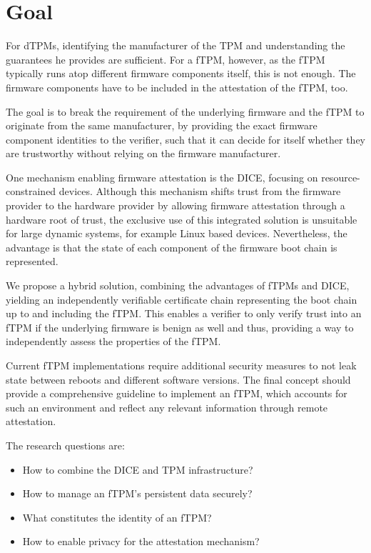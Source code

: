 \section{Goal}

For \acp{dTPM}, identifying the manufacturer of the TPM and understanding the guarantees he provides are sufficient. For a fTPM, however, as the fTPM typically runs atop different firmware components itself, this is not enough. The firmware components have to be included in the attestation of the fTPM, too.

The goal is to break the requirement of the underlying firmware and the fTPM to originate from the same manufacturer, by providing the exact firmware component identities to the verifier, such that it can decide for itself whether they are trustworthy without relying on the firmware manufacturer.


One mechanism enabling firmware attestation is the \ac{DICE}, focusing on resource-constrained devices. Although this mechanism shifts trust from the firmware provider to the hardware provider by allowing firmware attestation through a hardware root of trust, the exclusive use of this integrated solution is unsuitable for large dynamic systems, for example Linux based devices.
Nevertheless, the advantage is that the state of each component of the firmware boot chain is represented.


We propose a hybrid solution, combining the advantages of \acp{fTPM} and \ac{DICE}, yielding an independently verifiable certificate chain representing the boot chain up to and including the \ac{fTPM}.
This enables a verifier to only verify trust into an \ac{fTPM} if the underlying firmware is benign as well and thus, providing a way to independently assess the properties of the fTPM.

Current fTPM implementations require additional security measures to not leak state between reboots and different software versions.
The final concept should provide a comprehensive guideline to implement an fTPM, which accounts for such an environment and reflect any relevant information through remote attestation.

The research questions are:
\begin{itemize}
  \item How to combine the DICE and TPM infrastructure? %
  \item How to manage an fTPM's persistent data securely? %
  \item What constitutes the identity of an fTPM? %
  \item How to enable privacy for the attestation mechanism?
\end{itemize}

